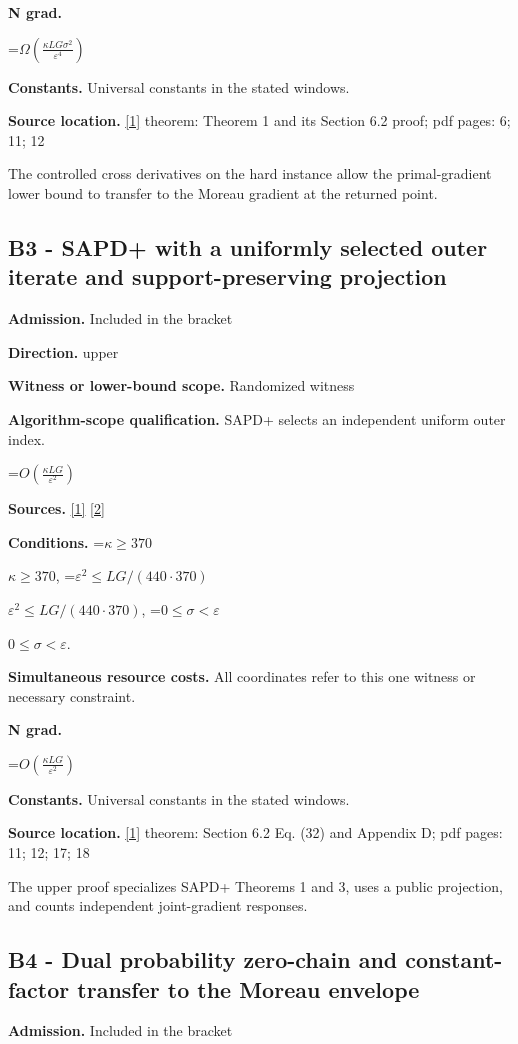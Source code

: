 \documentclass[10pt,a4paper]{article}
\newcommand{\AtlasMath}[1]{\par\begingroup\centering\setbox0=\hbox{$\displaystyle #1$}\ifdim\wd0>1.4\linewidth\typeout{ATLAS WIDE FORMULA: \the\wd0}\fi\ifdim\wd0>\linewidth\resizebox{\linewidth}{!}{\box0}\else\box0\fi\par\endgroup}
\newcommand{\AtlasInlineMath}[1]{\begingroup\setbox0=\hbox{$#1$}\ifdim\wd0>.4\linewidth\endgroup\AtlasMath{#1}\else\endgroup$#1$\fi}
\begin{document}
\textbf{N grad.}

\AtlasMath{\Omega\!\left(\frac{\kappa L G\sigma^2}{\varepsilon^4}\right)}
\textbf{Constants.} Universal constants in the stated windows.

\textbf{Source location.} \href{https://arxiv.org/pdf/2609.30877}{[1]} theorem: Theorem 1 and its Section 6.2 proof; pdf pages: 6; 11; 12

The controlled cross derivatives on the hard instance allow the primal-gradient lower bound to transfer to the Moreau gradient at the returned point.

\subsection{B3 - SAPD+ with a uniformly selected outer iterate and support-preserving projection}
\textbf{Admission.} Included in the bracket

\textbf{Direction.} upper

\textbf{Witness or lower-bound scope.} Randomized witness

\textbf{Algorithm-scope qualification.} SAPD+ selects an independent uniform outer index.

\AtlasMath{O\!\left(\frac{\kappa LG}{\varepsilon^2}\right)}
\textbf{Sources.} \href{https://arxiv.org/pdf/2609.30877}{[1]} \href{https://arxiv.org/abs/2205.15084v4}{[2]}

\textbf{Conditions.} \AtlasInlineMath{\kappa\ge370}, \AtlasInlineMath{\varepsilon^2\le LG/(440\cdot370)}, \AtlasInlineMath{0\le\sigma<\varepsilon}.

\textbf{Simultaneous resource costs.} All coordinates refer to this one witness or necessary constraint.

\textbf{N grad.}

\AtlasMath{O\!\left(\frac{\kappa LG}{\varepsilon^2}\right)}
\textbf{Constants.} Universal constants in the stated windows.

\textbf{Source location.} \href{https://arxiv.org/pdf/2609.30877}{[1]} theorem: Section 6.2 Eq. (32) and Appendix D; pdf pages: 11; 12; 17; 18

The upper proof specializes SAPD+ Theorems 1 and 3, uses a public projection, and counts independent joint-gradient responses.

\subsection{B4 - Dual probability zero-chain and constant-factor transfer to the Moreau envelope}
\textbf{Admission.} Included in the bracket
\end{document}
